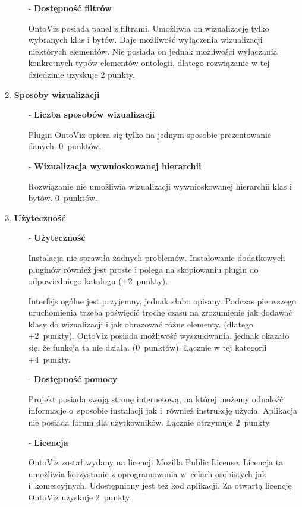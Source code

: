 \begin{enumerate}
\begin{itemize}
 \item[-]{\bf Dostępność filtrów} 

  \nopagebreak
OntoViz posiada panel z filtrami. Umożliwia on wizualizację tylko wybranych klas i bytów. Daje możliwość wyłączenia
 wizualizacji niektórych elementów. Nie posiada on jednak możliwości wyłączania konkretnych typów elementów ontologii, 
dlatego rozwiązanie w tej dziedzinie uzyskuje 2 punkty.


\end{itemize}

\item{\bf Sposoby wizualizacji}
\begin{itemize}
 \item[-]{\bf Liczba sposobów wizualizacji } 

  \nopagebreak

Plugin OntoViz opiera się tylko na  jednym sposobie prezentowanie danych. 0~punktów. 

 \item[-]{\bf  Wizualizacja wywnioskowanej hierarchii } 

  \nopagebreak
 Rozwiązanie nie umożliwia wizualizacji wywnioskowanej hierarchii klas i bytów. 0~punktów.
\end{itemize}


\item{\bf Użyteczność}
\begin{itemize}
 \item[-]{\bf Użyteczność  } 

  \nopagebreak
Instalacja \proteges nie sprawiła żadnych problemów. Instalowanie dodatkowych pluginów również jest proste i polega na skopiowaniu plugin
 do odpowiedniego katalogu (+2~punkty). 

Interfejs ogólne jest przyjemny, jednak słabo opisany. Podczas pierwszego uruchomienia trzeba poświęcić trochę czasu 
na zrozumienie jak dodawać klasy do wizualizacji i jak obrazować różne elementy. (dlatego +2~punkty). 
OntoViz posiada możliwość wyszukiwania, jednak okazało się, że funkcja ta nie działa. (0~punktów). Łącznie w tej kategorii +4~punkty.


 \item[-]{\bf Dostępność pomocy  } 

  \nopagebreak
  Projekt posiada swoją stronę internetową, na której możemy odnaleźć informacje o~sposobie instalacji jak i~również instrukcję użycia. 
Aplikacja nie posiada forum dla użytkowników. Łącznie otrzymuje 2~punkty.

 \item[-]{\bf Licencja  } 

  \nopagebreak
  OntoViz został wydany na licencji Mozilla Public License. Licencja ta umożliwia korzystanie z oprogramowania w~celach osobistych jak i~komercyjnych. 
Udostępniony jest też kod aplikacji. Za otwartą licencję OntoViz uzyskuje 2~punkty.
\end{itemize}


\end{enumerate}


